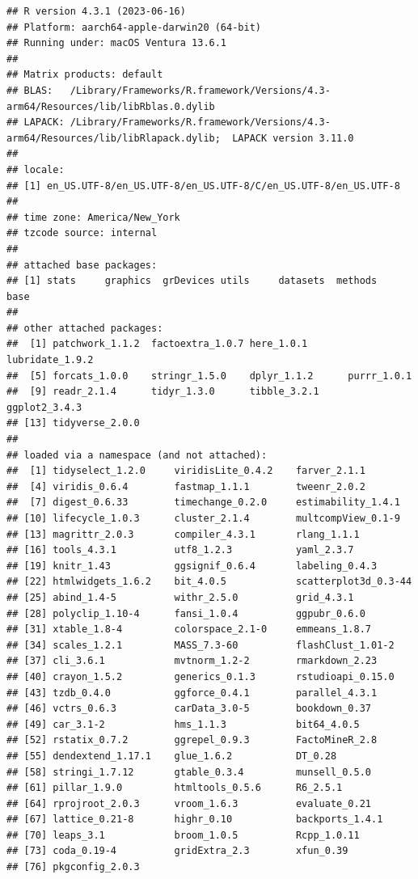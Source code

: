 \documentclass[
]{book}
\begin{document}
\begin{verbatim}
## R version 4.3.1 (2023-06-16)
## Platform: aarch64-apple-darwin20 (64-bit)
## Running under: macOS Ventura 13.6.1
## 
## Matrix products: default
## BLAS:   /Library/Frameworks/R.framework/Versions/4.3-arm64/Resources/lib/libRblas.0.dylib 
## LAPACK: /Library/Frameworks/R.framework/Versions/4.3-arm64/Resources/lib/libRlapack.dylib;  LAPACK version 3.11.0
## 
## locale:
## [1] en_US.UTF-8/en_US.UTF-8/en_US.UTF-8/C/en_US.UTF-8/en_US.UTF-8
## 
## time zone: America/New_York
## tzcode source: internal
## 
## attached base packages:
## [1] stats     graphics  grDevices utils     datasets  methods   base     
## 
## other attached packages:
##  [1] patchwork_1.1.2  factoextra_1.0.7 here_1.0.1       lubridate_1.9.2 
##  [5] forcats_1.0.0    stringr_1.5.0    dplyr_1.1.2      purrr_1.0.1     
##  [9] readr_2.1.4      tidyr_1.3.0      tibble_3.2.1     ggplot2_3.4.3   
## [13] tidyverse_2.0.0 
## 
## loaded via a namespace (and not attached):
##  [1] tidyselect_1.2.0     viridisLite_0.4.2    farver_2.1.1        
##  [4] viridis_0.6.4        fastmap_1.1.1        tweenr_2.0.2        
##  [7] digest_0.6.33        timechange_0.2.0     estimability_1.4.1  
## [10] lifecycle_1.0.3      cluster_2.1.4        multcompView_0.1-9  
## [13] magrittr_2.0.3       compiler_4.3.1       rlang_1.1.1         
## [16] tools_4.3.1          utf8_1.2.3           yaml_2.3.7          
## [19] knitr_1.43           ggsignif_0.6.4       labeling_0.4.3      
## [22] htmlwidgets_1.6.2    bit_4.0.5            scatterplot3d_0.3-44
## [25] abind_1.4-5          withr_2.5.0          grid_4.3.1          
## [28] polyclip_1.10-4      fansi_1.0.4          ggpubr_0.6.0        
## [31] xtable_1.8-4         colorspace_2.1-0     emmeans_1.8.7       
## [34] scales_1.2.1         MASS_7.3-60          flashClust_1.01-2   
## [37] cli_3.6.1            mvtnorm_1.2-2        rmarkdown_2.23      
## [40] crayon_1.5.2         generics_0.1.3       rstudioapi_0.15.0   
## [43] tzdb_0.4.0           ggforce_0.4.1        parallel_4.3.1      
## [46] vctrs_0.6.3          carData_3.0-5        bookdown_0.37       
## [49] car_3.1-2            hms_1.1.3            bit64_4.0.5         
## [52] rstatix_0.7.2        ggrepel_0.9.3        FactoMineR_2.8      
## [55] dendextend_1.17.1    glue_1.6.2           DT_0.28             
## [58] stringi_1.7.12       gtable_0.3.4         munsell_0.5.0       
## [61] pillar_1.9.0         htmltools_0.5.6      R6_2.5.1            
## [64] rprojroot_2.0.3      vroom_1.6.3          evaluate_0.21       
## [67] lattice_0.21-8       highr_0.10           backports_1.4.1     
## [70] leaps_3.1            broom_1.0.5          Rcpp_1.0.11         
## [73] coda_0.19-4          gridExtra_2.3        xfun_0.39           
## [76] pkgconfig_2.0.3
\end{verbatim}
\end{document}

